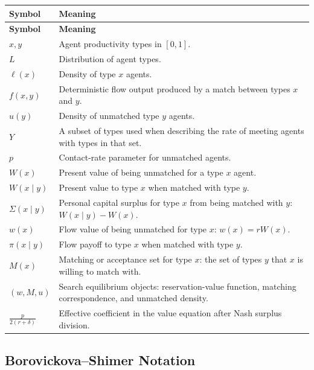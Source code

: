 \documentclass[11pt]{article}
\newcommand{\1}{\mathbf{1}}
\begin{document}
\begin{longtable}{p{}p{}}
\toprule
\textbf{Symbol} & \textbf{Meaning} \\
\midrule
\endfirsthead
\toprule
\textbf{Symbol} & \textbf{Meaning} \\
\midrule
\endhead
\bottomrule
\endfoot
$x,y$ & Agent productivity types in $[0,1]$. \\
$L$ & Distribution of agent types. \\
$\ell(x)$ & Density of type $x$ agents. \\
$f(x,y)$ & Deterministic flow output produced by a match between types $x$ and $y$. \\
$u(y)$ & Density of unmatched type $y$ agents. \\
$Y$ & A subset of types used when describing the rate of meeting agents with types in that set. \\
$p$ & Contact-rate parameter for unmatched agents. \\
$W(x)$ & Present value of being unmatched for a type $x$ agent. \\
$W(x\mid y)$ & Present value to type $x$ when matched with type $y$. \\
$\Sigma(x\mid y)$ & Personal capital surplus for type $x$ from being matched with $y$: $W(x\mid y)-W(x)$. \\
$w(x)$ & Flow value of being unmatched for type $x$: $w(x)=rW(x)$. \\
$\pi(x\mid y)$ & Flow payoff to type $x$ when matched with type $y$. \\
$M(x)$ & Matching or acceptance set for type $x$: the set of types $y$ that $x$ is willing to match with. \\
$(w,M,u)$ & Search equilibrium objects: reservation-value function, matching correspondence, and unmatched density. \\
$\frac{p}{2(r+\delta)}$ & Effective coefficient in the value equation after Nash surplus division. \\
\end{longtable}

\subsection*{Borovickova--Shimer Notation}
\end{document}
